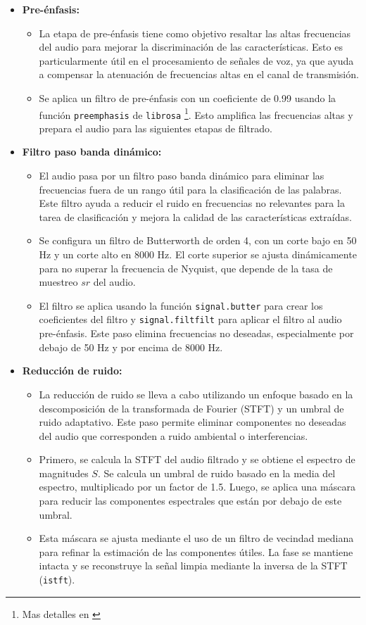\documentclass[12pt,a4paper]{article}
\begin{document}
\begin{itemize}

\item \textbf{Pre-énfasis:}
  \begin{itemize}
    \item La etapa de pre-énfasis tiene como objetivo resaltar las altas frecuencias del audio para mejorar la discriminación de las características. Esto es particularmente útil en el procesamiento de señales de voz, ya que ayuda a compensar la atenuación de frecuencias altas en el canal de transmisión. 
    \item Se aplica un filtro de pre-énfasis con un coeficiente de 0.99 usando la función \texttt{preemphasis} de \texttt{librosa} \footnote{Mas detalles en \cite{librosa}}. Esto amplifica las frecuencias altas y prepara el audio para las siguientes etapas de filtrado.
  \end{itemize}

\item \textbf{Filtro paso banda dinámico:}
  \begin{itemize}
    \item El audio pasa por un filtro paso banda dinámico para eliminar las frecuencias fuera de un rango útil para la clasificación de las palabras. Este filtro ayuda a reducir el ruido en frecuencias no relevantes para la tarea de clasificación y mejora la calidad de las características extraídas.
    \item Se configura un filtro de Butterworth de orden 4, con un corte bajo en 50 Hz y un corte alto en 8000 Hz. El corte superior se ajusta dinámicamente para no superar la frecuencia de Nyquist, que depende de la tasa de muestreo \(sr\) del audio.
    \item El filtro se aplica usando la función \texttt{signal.butter} para crear los coeficientes del filtro y \texttt{signal.filtfilt} para aplicar el filtro al audio pre-énfasis. Este paso elimina frecuencias no deseadas, especialmente por debajo de 50 Hz y por encima de 8000 Hz.
  \end{itemize}
\newpage
\item \textbf{Reducción de ruido:}
  \begin{itemize}
    \item La reducción de ruido se lleva a cabo utilizando un enfoque basado en la descomposición de la transformada de Fourier (STFT) y un umbral de ruido adaptativo. Este paso permite eliminar componentes no deseadas del audio que corresponden a ruido ambiental o interferencias.
    \item Primero, se calcula la STFT del audio filtrado y se obtiene el espectro de magnitudes \(S\). Se calcula un umbral de ruido basado en la media del espectro, multiplicado por un factor de 1.5. Luego, se aplica una máscara para reducir las componentes espectrales que están por debajo de este umbral.
    \item Esta máscara se ajusta mediante el uso de un filtro de vecindad mediana para refinar la estimación de las componentes útiles. La fase se mantiene intacta y se reconstruye la señal limpia mediante la inversa de la STFT (\texttt{istft}).
  \end{itemize}


\end{itemize}
\end{document}
